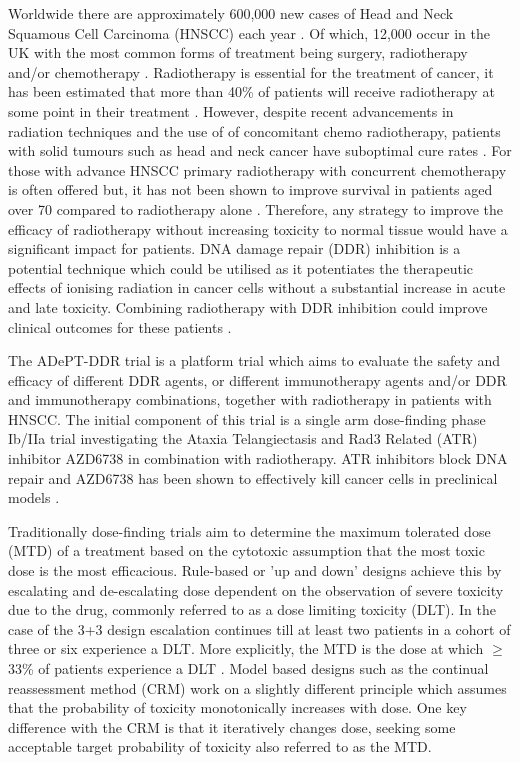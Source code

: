 Worldwide there are approximately 600,000 new cases of Head and Neck Squamous Cell Carcinoma (HNSCC) each year \cite{stransky_mutational_2011}. Of which, 12,000 occur in the UK with the most common forms of treatment being surgery, radiotherapy and/or chemotherapy \cite{cancer_research_uk_head_2017}. Radiotherapy is essential for the treatment of cancer, it has been estimated that more than 40\% of patients will receive radiotherapy at some point in their treatment \cite{round_radiotherapy_2013}. However, despite recent advancements in radiation techniques and the use of of concomitant chemo radiotherapy, patients with solid tumours such as head and neck cancer have suboptimal cure rates \cite{cancer_research_uk_head_2017,cognetti_head_2008}. For those with advance HNSCC primary radiotherapy with concurrent chemotherapy is often offered but, it has not been shown to improve survival in patients aged over 70 compared to radiotherapy alone \cite{pignon_chemotherapy_2000}. Therefore, any strategy to improve the efficacy of radiotherapy without increasing toxicity to normal tissue would have a significant impact for patients. DNA damage repair (DDR) inhibition is a potential technique which could be utilised as it potentiates the therapeutic effects of ionising radiation in cancer cells without a substantial increase in acute and late toxicity. Combining radiotherapy with DDR inhibition could improve clinical outcomes for these patients \cite{chalmers_science_2016}.  

The ADePT-DDR trial is a platform trial which aims to evaluate the safety and efficacy of different DDR agents, or different immunotherapy agents and/or DDR and immunotherapy combinations, together with radiotherapy in patients with HNSCC. The initial component of this trial is a single arm dose-finding phase \RN{1}b/\RN{2}a trial investigating the Ataxia Telangiectasis and Rad3 Related (ATR) inhibitor AZD6738 in combination with radiotherapy. ATR inhibitors block DNA repair and AZD6738 has been shown to effectively kill cancer cells in preclinical models \cite{mei_ataxia_2019}. 

Traditionally dose-finding trials aim to determine the maximum tolerated dose (MTD) of a treatment based on the cytotoxic assumption that the most toxic dose is the most efficacious. Rule-based or 'up and down' designs achieve this by escalating and de-escalating dose dependent on the observation of severe toxicity due to the drug,  commonly referred to as a dose limiting toxicity (DLT). In the case of the 3+3 design escalation continues till at least two patients in a cohort of three or six experience a DLT. More explicitly, the MTD is the dose at which $\geq$33\% of patients experience a DLT \cite{le_tourneau_dose_2009}. Model based designs such as the continual reassessment method (CRM) \cite{oquigley_continual_1990} work on a slightly different principle which assumes that the probability of toxicity monotonically increases with dose. One key difference with the CRM is that it iteratively changes dose, seeking some acceptable target probability of toxicity also referred to as the MTD. 

